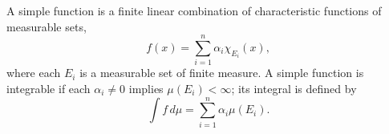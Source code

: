 A simple function is a finite linear combination of characteristic functions of measurable sets,
$$f(x) = \sum_{i=1}^{n} \alpha_i \chi_{E_i}(x),$$
where each $E_i$ is a measurable set of finite measure. A simple function is integrable if each $\alpha_i \neq 0$ implies $\mu(E_i) < \infty$; its integral is defined by
$$\int f \,d\mu = \sum_{i=1}^{n} \alpha_i \mu(E_i).$$
